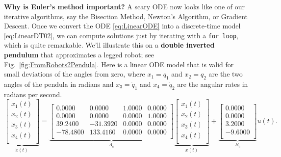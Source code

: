 \textbf{Why is Euler's method important?} A scary ODE now looks like one of our iterative algorithms, say the Bisection Method, Newton's Algorithm, or Gradient Descent. Once we convert the ODE \eqref{eq:LinearODE} into a discrete-time model \eqref{eq:LinearDT02}, we can compute solutions just by iterating with a \texttt{for\,loop}, which is quite remarkable. We'll illustrate this on a \textbf{double inverted pendulum} that approximates a legged robot; see Fig.~\ref{fig:FromRobots2Pendula}. Here is a linear ODE model that is valid for small deviations of the angles from zero, where $x_1 = q_1$ and $x_2 = q_2$ are the two angles of the pendula in radians and  $x_3 = \dot{q}_1$ and $x_4 = \dot{q}_2$ are the angular rates in radians per second. 
\begin{equation}
\label{eq:LinearizedDoubleInvertedPendulum}
 \underbrace{ \left[
\begin{array}{r}
\dot{x}_1(t) \\
\dot{x}_2(t) \\
\dot{x}_3(t) \\
\dot{x}_4(t) \\
\end{array}
\right]}_{\dot{x}(t)} = \underbrace{\left[
\begin{array}{rrrr}
0.0000 & 0.0000 & 1.0000 & 0.0000 \\
0.0000 & 0.0000 & 0.0000 & 1.0000 \\
39.2400 & -31.3920 & 0.0000 & 0.0000 \\
-78.4800 & 133.4160 & 0.0000 & 0.0000 \\
\end{array}
\right]}_{A_c} \underbrace{\left[
\begin{array}{r}
x_1(t) \\
x_2(t) \\
x_3(t) \\
x_4(t) \\
\end{array}
\right]}_{x(t)} + \underbrace{\left[
\begin{array}{r}
0.0000 \\
0.0000 \\
3.2000 \\
-9.6000 \\
\end{array}
\right]}_{B_c} u(t).
\end{equation}

